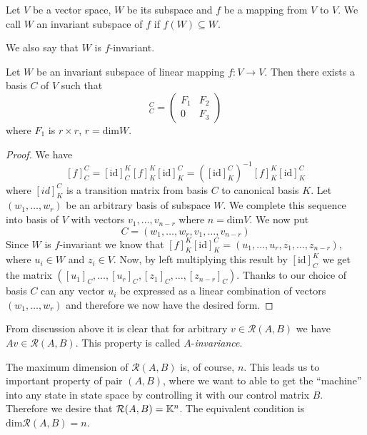 \begin{definition}
	Let $V$ be a vector space, $W$ be its subspace and $f$ be a mapping from $V$ to $V$. We call $W$ an invariant subspace of $f$ if $f(W)\subseteq W$. 

	We also say that $W$ is $f$-invariant.
\end{definition}

\begin{lemma}
	\label{lem:invmatrix}
	Let $W$ be an invariant subspace of linear mapping $f\colon V \rightarrow V$. Then there exists a basis $C$ of $V$ such that 
	\begin{equation*}
		[f]^C_C=
		\begin{pmatrix}
			F_1 & F_2 \\
			0   & F_3 
		\end{pmatrix}
	\end{equation*}
	where $F_1$ is $r\times r$, $r=\text{dim}W$.
\end{lemma}

\begin{proof}
	We have $$[f]^C_C=[\text{id}]^K_C [f]^K_K [\text{id}]^C_K=([\text{id}]^C_K)^{-1} [f]^K_K [\text{id}]^C_K$$ where $[id]^C_K$ is a transition matrix from basis $C$ to canonical basis $K$. Let $(w_1,\ldots,w_r)$ be an arbitrary basis of subspace $W$. We complete this sequence into basis of $V$ with vectors $v_1,\ldots,v_{n-r}$ where $n=\text{dim}V$. We now put $$C=(w_1,\ldots,w_r,v_1,\ldots,v_{n-r})$$ Since $W$ is $f$-invariant we know that $[f]^K_K [\text{id}]^C_K = (u_1,\ldots,u_r,z_1,\ldots,z_{n-r})$, where $u_i\in W$ and $z_i\in V$. Now, by left multiplying this result by $[\text{id}]^K_C$ we get the matrix $([u_1]_C,\ldots,[u_r]_C,[z_1]_C,\ldots,[z_{n-r}]_C)$. Thanks to our choice of basis $C$ can any vector $u_i$ be expressed as a linear combination of vectors $(w_1,\ldots,w_r)$ and therefore we now have the desired form.
\end{proof}

From discussion above it is clear that for arbitrary $v\in\mathcal{R}(A,B)$ we have $Av\in\mathcal{R}(A,B)$. This property is called $A$-\textit{invariance}.

The maximum dimension of $\mathcal{R}(A,B)$ is, of course, $n$. This leads us to important property of pair $(A,B)$, where we want to able to get the ``machine'' into any state in state space by controlling it with our control matrix $B$. Therefore we desire that $\mathcal{R}(A,B)=\mathbb{K}^n$. The equivalent condition is $\text{dim}\mathcal{R}(A,B)=n$.

